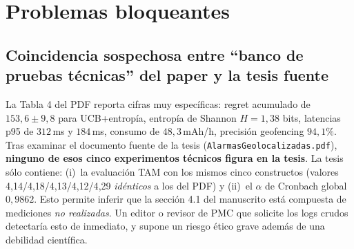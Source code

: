 \documentclass[11pt,a4paper]{article}
\begin{document}
\section{Problemas bloqueantes}

\subsection{Coincidencia sospechosa entre ``banco de pruebas t\'ecnicas'' del paper y la tesis fuente}

\begin{deficiencia}[B.1 --- Deficiencia]
La Tabla 4 del PDF reporta cifras muy espec\'ificas: regret acumulado de $153{,}6 \pm 9{,}8$ para UCB+entrop\'ia, entrop\'ia de Shannon $H=1{,}38$ bits, latencias p95 de $312$\,ms y $184$\,ms, consumo de $48{,}3$\,mAh/h, precisi\'on geofencing $94{,}1\%$. Tras examinar el documento fuente de la tesis (\texttt{AlarmasGeolocalizadas.pdf}), \textbf{ninguno de esos cinco experimentos t\'ecnicos figura en la tesis}. La tesis s\'olo contiene: (i)~la evaluaci\'on TAM con los mismos cinco constructos (valores 4{,}14/4{,}18/4{,}13/4{,}12/4{,}29 \emph{id\'enticos} a los del PDF) y (ii)~el $\alpha$ de Cronbach global $0{,}9862$. Esto permite inferir que la secci\'on 4.1 del manuscrito est\'a compuesta de mediciones \emph{no realizadas}. Un editor o revisor de PMC que solicite los logs crudos detectar\'ia esto de inmediato, y supone un riesgo \'etico grave adem\'as de una debilidad cient\'ifica.
\end{deficiencia}
\end{document}
